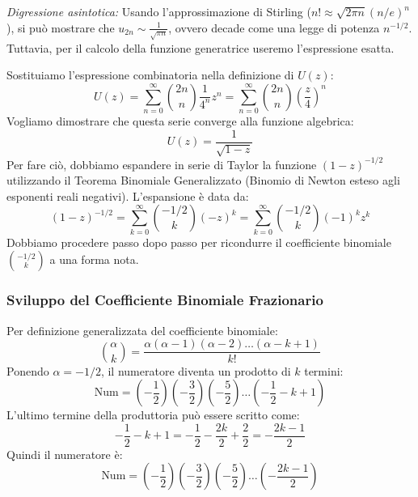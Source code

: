 \textit{Digressione asintotica:} Usando l'approssimazione di Stirling ($n! \approx \sqrt{2\pi n} (n/e)^n$), si può mostrare che $u_{2n} \sim \frac{1}{\sqrt{\pi n}}$, ovvero decade come una legge di potenza $n^{-1/2}$. Tuttavia, per il calcolo della funzione generatrice useremo l'espressione esatta.

\hfill

\noindent Sostituiamo l'espressione combinatoria nella definizione di $U(z)$:
\begin{equation}
    U(z) = \sum_{n=0}^{\infty} \binom{2n}{n} \frac{1}{4^n} z^n = \sum_{n=0}^{\infty} \binom{2n}{n} \left(\frac{z}{4}\right)^n
\end{equation}
Vogliamo dimostrare che questa serie converge alla funzione algebrica:
\begin{equation}
    U(z) = \frac{1}{\sqrt{1-z}} 
\end{equation}
Per fare ciò, dobbiamo espandere in serie di Taylor la funzione $(1-z)^{-1/2}$ utilizzando il Teorema Binomiale Generalizzato (Binomio di Newton esteso agli esponenti reali negativi).
L'espansione è data da:
\begin{equation}
    (1-z)^{-1/2} = \sum_{k=0}^{\infty} \binom{-1/2}{k} (-z)^k = \sum_{k=0}^{\infty} \binom{-1/2}{k} (-1)^k z^k
\end{equation}
Dobbiamo procedere passo dopo passo per ricondurre il coefficiente binomiale $\binom{-1/2}{k}$ a una forma nota.


\subsubsection{Sviluppo del Coefficiente Binomiale Frazionario}
Per definizione generalizzata del coefficiente binomiale:
\begin{equation}
    \binom{\alpha}{k} = \frac{\alpha (\alpha-1) (\alpha-2) \dots (\alpha-k+1)}{k!}
\end{equation}
Ponendo $\alpha = -1/2$, il numeratore diventa un prodotto di $k$ termini:
\begin{equation}
    \text{Num} = \left(-\frac{1}{2}\right) \left(-\frac{3}{2}\right) \left(-\frac{5}{2}\right) \dots \left(-\frac{1}{2} - k + 1\right)
\end{equation}
L'ultimo termine della produttoria può essere scritto come:
\begin{equation}
    -\frac{1}{2} - k + 1 = -\frac{1}{2} - \frac{2k}{2} + \frac{2}{2} = -\frac{2k-1}{2}
\end{equation}
Quindi il numeratore è:
\begin{equation}
    \text{Num} = \left(-\frac{1}{2}\right) \left(-\frac{3}{2}\right) \left(-\frac{5}{2}\right) \dots \left(-\frac{2k-1}{2}\right)
\end{equation}

